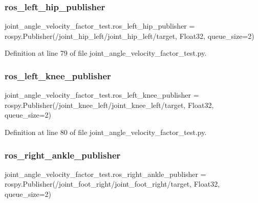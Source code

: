 \subsubsection{\texorpdfstring{ros\_left\_hip\_publisher}{ros\_left\_hip\_publisher}}
{\footnotesize\ttfamily joint\+\_\+angle\+\_\+velocity\+\_\+factor\+\_\+test.\+ros\+\_\+left\+\_\+hip\+\_\+publisher = rospy.\+Publisher(\textquotesingle{}/joint\+\_\+hip\+\_\+left/joint\+\_\+hip\+\_\+left/target\textquotesingle{}, Float32, queue\+\_\+size=2)}



Definition at line 79 of file joint\+\_\+angle\+\_\+velocity\+\_\+factor\+\_\+test.\+py.

\mbox{\label{namespacejoint__angle__velocity__factor__test_a16ed2bbdceab6a36b04a4a4817f2a38e}} 
\subsubsection{\texorpdfstring{ros\_left\_knee\_publisher}{ros\_left\_knee\_publisher}}
{\footnotesize\ttfamily joint\+\_\+angle\+\_\+velocity\+\_\+factor\+\_\+test.\+ros\+\_\+left\+\_\+knee\+\_\+publisher = rospy.\+Publisher(\textquotesingle{}/joint\+\_\+knee\+\_\+left/joint\+\_\+knee\+\_\+left/target\textquotesingle{}, Float32, queue\+\_\+size=2)}



Definition at line 80 of file joint\+\_\+angle\+\_\+velocity\+\_\+factor\+\_\+test.\+py.

\mbox{\label{namespacejoint__angle__velocity__factor__test_a9aa60022fc817fdfb6486f76c278c3fd}} 
\subsubsection{\texorpdfstring{ros\_right\_ankle\_publisher}{ros\_right\_ankle\_publisher}}
{\footnotesize\ttfamily joint\+\_\+angle\+\_\+velocity\+\_\+factor\+\_\+test.\+ros\+\_\+right\+\_\+ankle\+\_\+publisher = rospy.\+Publisher(\textquotesingle{}/joint\+\_\+foot\+\_\+right/joint\+\_\+foot\+\_\+right/target\textquotesingle{}, Float32, queue\+\_\+size=2)}




